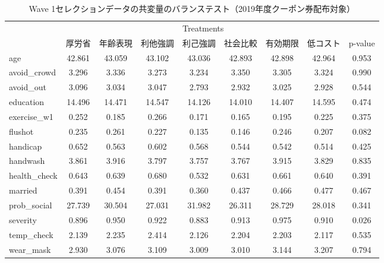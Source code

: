 \documentclass[
  11pt,
  a4paper,
]{article}
\begin{document}
\begin{table}

\caption{\label{tab:show-act-coupon1-balance}Wave 1セレクションデータの共変量のバランステスト（2019年度クーポン券配布対象）}
\centering
\begin{tabular}[t]{lcccccccc}
\toprule
\multicolumn{1}{c}{ } & \multicolumn{7}{c}{Treatments} & \multicolumn{1}{c}{ } \\
\cmidrule(l{3pt}r{3pt}){2-8}
  & 厚労省 & 年齢表現 & 利他強調 & 利己強調 & 社会比較 & 有効期限 & 低コスト & p-value\\
\midrule
age & 42.861 & 43.059 & 43.102 & 43.036 & 42.893 & 42.898 & 42.964 & 0.953\\
avoid\_crowd & 3.296 & 3.336 & 3.273 & 3.234 & 3.350 & 3.305 & 3.324 & 0.990\\
avoid\_out & 3.096 & 3.034 & 3.047 & 2.793 & 2.932 & 3.025 & 2.928 & 0.544\\
education & 14.496 & 14.471 & 14.547 & 14.126 & 14.010 & 14.407 & 14.595 & 0.474\\
exercise\_w1 & 0.252 & 0.185 & 0.266 & 0.171 & 0.165 & 0.195 & 0.225 & 0.375\\
flushot & 0.235 & 0.261 & 0.227 & 0.135 & 0.146 & 0.246 & 0.207 & 0.082\\
handicap & 0.652 & 0.563 & 0.602 & 0.568 & 0.544 & 0.542 & 0.514 & 0.425\\
handwash & 3.861 & 3.916 & 3.797 & 3.757 & 3.767 & 3.915 & 3.829 & 0.835\\
health\_check & 0.643 & 0.639 & 0.680 & 0.532 & 0.631 & 0.661 & 0.640 & 0.391\\
married & 0.391 & 0.454 & 0.391 & 0.360 & 0.437 & 0.466 & 0.477 & 0.467\\
prob\_social & 27.739 & 30.504 & 27.031 & 31.982 & 26.311 & 28.729 & 28.018 & 0.341\\
severity & 0.896 & 0.950 & 0.922 & 0.883 & 0.913 & 0.975 & 0.910 & 0.026\\
temp\_check & 2.139 & 2.235 & 2.414 & 2.126 & 2.204 & 2.203 & 2.117 & 0.535\\
wear\_mask & 2.930 & 3.076 & 3.109 & 3.009 & 3.010 & 3.144 & 3.207 & 0.794\\
\bottomrule
\end{tabular}
\end{table}
\end{document}
